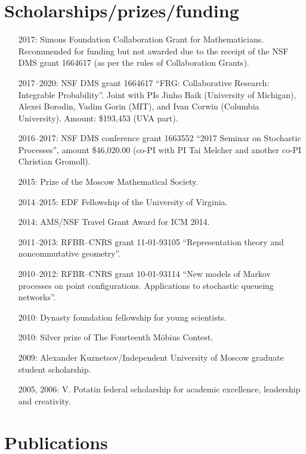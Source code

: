 \documentclass[letterpaper,11pt]{article}
\begin{document}
\section*{Scholarships/prizes/funding}
\begin{itemize}
	\item
	      [2017:] Simons Foundation Collaboration Grant for
	      Mathematicians.
	      Recommended
	      for funding but not awarded due to the receipt of the NSF DMS
	      grant 1664617
	      (as per the rules of Collaboration Grants).
	\item
	      [2017--2020:] NSF DMS grant 1664617
	      ``FRG: Collaborative Research: Integrable Probability''.
	      Joint with PIs Jinho Baik (University of Michigan),
	      Alexei Borodin, Vadim Gorin (MIT),
	      and Ivan Corwin (Columbia University).
	      Amount: \$193,453 (UVA part).
	\item
	      [2016--2017:]
	      NSF DMS conference grant 1663552 ``2017 Seminar on Stochastic
	      Processes'', amount \$46,020.00
	      (co-PI with PI Tai Melcher and another co-PI Christian Gromoll).
	\item
	      [2015:] Prize of the Moscow Mathematical Society.
	\item
	      [2014--2015:] EDF Fellowship of the University of Virginia.
	\item
	      [2014:] AMS/NSF Travel Grant Award for ICM 2014.
	\item
	      [2011--2013:] RFBR--CNRS grant 11-01-93105 ``Representation
	      theory and noncommutative geometry''.
	\item
	      [2010--2012:] RFBR--CNRS grant 10-01-93114 ``New models of
	      Markov
	      processes on point configurations. Applications to stochastic
	      queueing
	      networks''.
	\item
	      [2010:] Dynasty foundation fellowship for young scientists.
	\item
	      [2010:] Silver prize of The Fourteenth M\"obius Contest.
	\item
	      [2009:] Alexander Kuznetsov/Independent University of Moscow
	      graduate student scholarship.
	\item
	      [2005, 2006:] V. Potatin federal scholarship for academic
	      excellence, leadership and creativity.
\end{itemize}

\section*{Publications}
\end{document}
